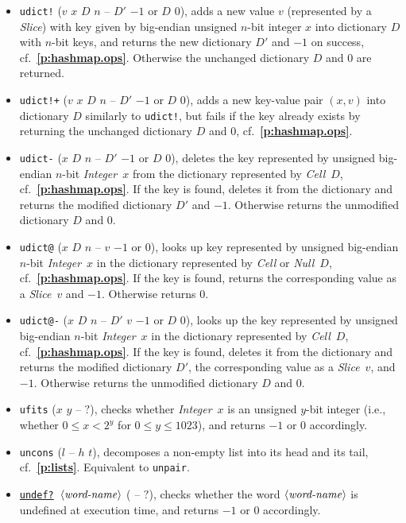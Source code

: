 \documentclass[12pt,oneside]{article}
\def\refpoint#1{{\rm\textbf{\ref{#1}}}}
\let\ptref=\refpoint
\begin{document}
\begin{itemize}
\item {\tt udict!} ($v$ $x$ $D$ $n$ -- $D'$ $-1$ or $D$ $0$), adds a new value $v$ (represented by a {\em Slice\/}) with key given by big-endian unsigned $n$-bit integer $x$ into dictionary $D$ with $n$-bit keys, and returns the new dictionary $D'$ and $-1$ on success, cf.~\ptref{p:hashmap.ops}. Otherwise the unchanged dictionary $D$ and $0$ are returned.
\item {\tt udict!+} ($v$ $x$ $D$ $n$ -- $D'$ $-1$ or $D$ $0$), adds a new key-value pair $(x,v)$ into dictionary $D$ similarly to {\tt udict!}, but fails if the key already exists by returning the unchanged dictionary $D$ and $0$, cf.~\ptref{p:hashmap.ops}.
\item {\tt udict-} ($x$ $D$ $n$ -- $D'$ $-1$ or $D$ $0$), deletes the key represented by unsigned big-endian $n$-bit {\em Integer\/}~$x$ from the dictionary represented by {\em Cell\/}~$D$, cf.~\ptref{p:hashmap.ops}. If the key is found, deletes it from the dictionary and returns the modified dictionary $D'$ and $-1$. Otherwise returns the unmodified dictionary $D$ and $0$.
\item {\tt udict@} ($x$ $D$ $n$ -- $v$ $-1$ or $0$), looks up key represented by unsigned big-endian $n$-bit {\em Integer\/}~$x$ in the dictionary represented by {\em Cell\/} or {\em Null\/}~$D$, cf.~\ptref{p:hashmap.ops}. If the key is found, returns the corresponding value as a {\em Slice\/}~$v$ and $-1$. Otherwise returns $0$.
\item {\tt udict@-} ($x$ $D$ $n$ -- $D'$ $v$ $-1$ or $D$ $0$), looks up the key represented by unsigned big-endian $n$-bit {\em Integer\/}~$x$ in the dictionary represented by {\em Cell\/}~$D$, cf.~\ptref{p:hashmap.ops}. If the key is found, deletes it from the dictionary and returns the modified dictionary $D'$, the corresponding value as a {\em Slice\/}~$v$, and $-1$. Otherwise returns the unmodified dictionary $D$ and $0$.
\item {\tt ufits} ($x$ $y$ -- $?$), checks whether {\em Integer\/}~$x$ is an unsigned $y$-bit integer (i.e., whether $0\leq x<2^y$ for $0\leq y\leq 1023$), and returns $-1$ or $0$ accordingly.
\item {\tt uncons} ($l$ -- $h$ $t$), decomposes a non-empty list into its head and its tail, cf.~\ptref{p:lists}. Equivalent to {\tt unpair}.
\item {\tt \underline{undef?} $\langle\textit{word-name\/}\rangle$} ( -- $?$), checks whether the word $\langle\textit{word-name\/}\rangle$ is undefined at execution time, and returns $-1$ or $0$ accordingly.

\end{itemize}
\end{document}
